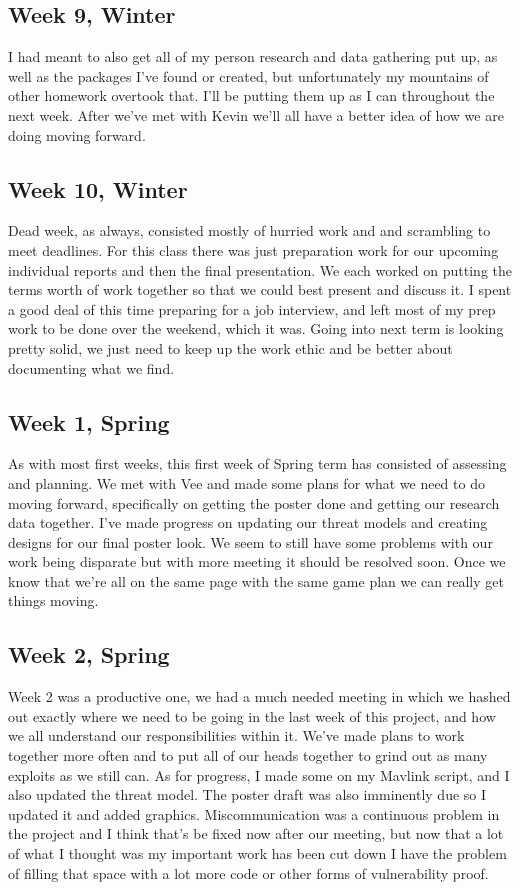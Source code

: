 \documentclass[IEEEtran,letterpaper,10pt,notitlepage,draftclsnofoot,onecolumn]{article}
\begin{document}
\begin{sloppypar}
\subsection{Week 9, Winter}
I had meant to also get all of my person research and data gathering put up, as well as the packages I've found or created, but unfortunately my mountains of other homework overtook that. I'll be putting them up as I can throughout the next week. After we've met with Kevin we'll all have a better idea of how we are doing moving forward.
\subsection{Week 10, Winter}
Dead week, as always, consisted mostly of hurried work and and scrambling to meet deadlines. For this class there was just preparation work for our upcoming individual reports and then the final presentation. We each worked on putting the terms worth of work together so that we could best present and discuss it. I spent a good deal of this time preparing for a job interview, and left most of my prep work to be done over the weekend, which it was. Going into next term is looking pretty solid, we just need to keep up the work ethic and be better about documenting what we find.
\subsection{Week 1, Spring}
As with most first weeks, this first week of Spring term has consisted of assessing and planning. We met with Vee and made some plans for what we need to do moving forward, specifically on getting the poster done and getting our research data together. I've made progress on updating our threat models and creating designs for our final poster look. We seem to still have some problems with our work being disparate but with more meeting it should be resolved soon. Once we know that we're all on the same page with the same game plan we can really get things moving.
\subsection{Week 2, Spring}
Week 2 was a productive one, we had a much needed meeting in which we hashed out exactly where we need to be going in the last week of this project, and how we all understand our responsibilities within it. We've made plans to work together more often and to put all of our heads together to grind out as many exploits as we still can. As for progress, I made some on my Mavlink script, and I also updated the threat model. The poster draft was also imminently due so I updated it and added graphics. Miscommunication was a continuous problem in the project and I think that's be fixed now after our meeting, but now that a lot of what I thought was my important work has been cut down I have the problem of filling that space with a lot more code or other forms of vulnerability proof.

\end{sloppypar}
\end{document}
